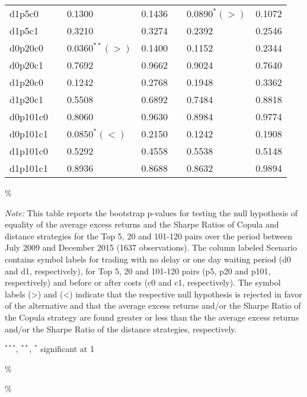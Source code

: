 \documentclass[a4paper]{article}
\begin{document}
\begin{threeparttable}[H]
\begin{tabularx}{\textwidth}{@{\extracolsep{\fill}}lllllll@{}}
			d1p5c0 & & 0.1300 & 0.1436 &       & $0.0890^{*}(>)$ & 0.1072 \\
			d1p5c1 & & 0.3210 & 0.3274 &       & 0.2392 & 0.2546 \\
			d0p20c0 & & $0.0360^{**}(>)$ & 0.1400 &       & 0.1152 & 0.2344 \\
			d0p20c1 & & 0.7692 & 0.9662 &       & 0.9024 & 0.7640 \\
			d1p20c0 & & 0.1242 & 0.2768 &       & 0.1948 & 0.3362 \\
			d1p20c1 & & 0.5508 & 0.6892 &       & 0.7484 & 0.8818 \\
			d0p101c0 & & 0.8060 & 0.9630 &       & 0.8984 & 0.9774 \\
			d0p101c1 & & $0.0850^{*}(<)$ & 0.2150 &       & 0.1242 & 0.1908 \\
			d1p101c0 & & 0.5292 & 0.4558 &       & 0.5538 & 0.5148 \\
			d1p101c1 & & 0.8936 & 0.8688 &       & 0.8632 & 0.9894 \\
			\bottomrule
		\end{tabularx}\%
		\begin{tablenotes}
			\item \textit{Note:} \scriptsize This table reports the bootstrap p-values for testing the null hypothesis of equality of the average excess returns and the Sharpe Ratios of Copula and distance strategies for the Top 5, 20 and 101-120 pairs over the period between July 2009 and December 2015 (1637 observations). The column labeled Scenario contains symbol labels for trading with no delay or one day waiting period (d0 and d1, respectively), for Top 5, 20 and 101-120 pairs (p5, p20 and p101, respectively) and before or after costs (c0 and c1, respectively). The symbol labels (>) and (<) indicate that the respective null hypothesis is rejected in favor of the alternative and that the average excess returns and/or the Sharpe Ratio of the Copula strategy are found greater or less than the the average excess returns and/or the Sharpe Ratio of the distance strategies, respectively.
			\item \scriptsize $^{\ast\ast\ast}$, $^{\ast\ast}$, $^{\ast}$  significant at 1\\%
		\end{tablenotes}
		\label{tab:table125}\%
	\end{threeparttable}\%
	
	\vspace{1.0cm}
	
\end{document}
